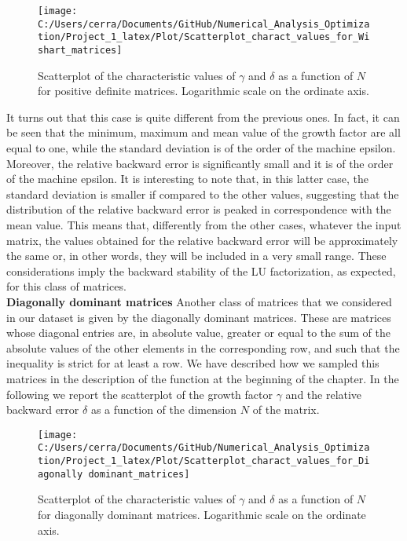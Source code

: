 \documentclass[a4paper,11pt]{article}
\begin{document}
\begin{figure}[H]
	\centering
	\texttt{[image: C:/Users/cerra/Documents/GitHub/Numerical\_Analysis\_Optimization/Project\_1\_latex/Plot/Scatterplot\_charact\_values\_for\_Wishart\_matrices]}
	\caption{Scatterplot of the characteristic values of $\gamma$ and $\delta$ as a function of $N$ for positive definite matrices. Logarithmic scale on the ordinate axis.}
	\label{fig:Scatterplot_Wishart}
\end{figure}

\noindent It turns out that this case is quite different from the previous ones. In fact, it can be seen that the minimum, maximum and mean value of the growth factor are all equal to one, while the standard deviation is of the order of the machine epsilon. Moreover, the relative backward error is significantly small and it is of the order of the machine epsilon. It is interesting to note that, in this latter case, the standard deviation is smaller if compared to the other values, suggesting that the distribution of the relative backward error is peaked in correspondence with the mean value. This means that, differently from the other cases, whatever the input matrix, the values obtained for the relative backward error will be approximately the same or, in other words, they will be included in a very small range. These considerations imply the backward stability of the LU factorization, as expected, for this class of matrices.\\

\noindent \textbf{Diagonally dominant matrices } Another class of matrices that we considered in our dataset is given by the diagonally dominant matrices. These are matrices whose diagonal entries are, in absolute value, greater or equal to the sum of the absolute values of the other elements in the corresponding row, and such that the inequality is strict for at least a row. We have described how we sampled this matrices in the description of the function at the beginning of the chapter. In the following we report the scatterplot of the growth factor $\gamma$ and the relative backward error $\delta$ as a function of the dimension $N$ of the matrix.

\begin{figure}[H]
	\centering
	\texttt{[image: C:/Users/cerra/Documents/GitHub/Numerical\_Analysis\_Optimization/Project\_1\_latex/Plot/Scatterplot\_charact\_values\_for\_Diagonally dominant\_matrices]}
	\caption{Scatterplot of the characteristic values of $\gamma$ and $\delta$ as a function of $N$ for diagonally dominant matrices. Logarithmic scale on the ordinate axis.}
	\label{fig:Scatterplot_Diag_dom}
\end{figure}
\end{document}
